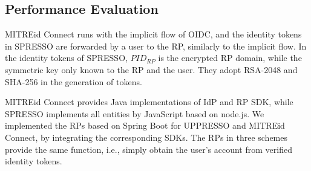 \subsection{Performance Evaluation}
\label{sec:evaluation}




MITREid Connect runs with the implicit flow of OIDC,
 and the identity tokens in SPRESSO are forwarded by a user to the RP,
    similarly to the implicit flow. %
In the identity tokens of SPRESSO, $PID_{RP}$ is the encrypted RP domain, while the symmetric key only known to the RP and the user.
They adopt RSA-2048 and SHA-256  in the generation of tokens.


MITREid Connect provides Java implementations of IdP and
RP SDK,
 while SPRESSO implements all entities by JavaScript based on node.js.
We implemented the RPs based on Spring Boot for UPPRESSO and MITREid Connect, by integrating the corresponding SDKs.
The RPs in three schemes provide the same function, i.e.,
     simply obtain the user's account from verified identity tokens.

